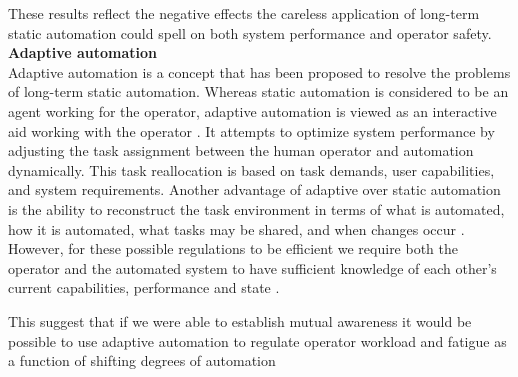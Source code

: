 These results reflect the negative effects the careless application of long-term static automation could spell on both system performance and operator safety.\\[10pt]
\textbf{Adaptive automation}\\[10pt]
Adaptive automation is a concept that has been proposed to resolve the problems of long-term static automation. Whereas static automation is considered to be an agent working for the operator, adaptive automation is viewed as an interactive aid working with the operator \cite{Byrne2006}. It attempts to optimize system performance by adjusting the task assignment between the human operator and automation dynamically. This task reallocation is based on task demands, user capabilities, and system requirements. Another advantage of adaptive over static automation is the ability to reconstruct the task environment in terms of what is automated, how it is automated, what tasks may be shared, and when changes occur \cite{Byrne2006}. However, for these possible regulations to be efficient we require both the operator and the automated system to have sufficient knowledge of each other's current capabilities, performance and state \cite{Byrne2006}.


This suggest that if we were able to establish mutual awareness it would be possible to use adaptive automation to regulate operator workload and fatigue as a function of shifting degrees of automation




